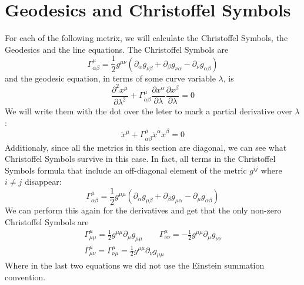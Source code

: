\documentclass{article}
\begin{document}
\section{Geodesics and Christoffel Symbols}
For each of the following metrix, we will calculate the Christoffel Symbols, the Geodesics and the line equations. The Christoffel Symbols are
\begin{equation}
    \Gamma^\mu_{\alpha\beta} = \frac{1}{2}g^{\mu\nu}\left(\partial_{\alpha}g_{\nu\beta} + \partial_{\beta}g_{\nu\alpha} - \partial_{\nu}g_{\alpha\beta}\right)
\end{equation}
and the geodesic equation, in terms of some curve variable $\lambda$, is
\begin{equation}
    \frac{\partial^2 x^\mu}{\partial \lambda^2} + \Gamma^\mu_{\alpha\beta} \frac{\partial x^\alpha}{\partial \lambda} \frac{\partial x^\beta}{\partial \lambda} = 0
\end{equation}
We will write them with the dot over the leter to mark a partial derivative over $\lambda$:
\begin{equation}
\label{eq:geodesic}
    \ddot{x}^\mu + \Gamma^\mu_{\alpha\beta}\dot{x}^\alpha\dot{x}^\beta = 0
\end{equation}
Additionaly, since all the metrics in this section are diagonal, we can see what Christoffel Symbols survive in this case. In fact, all terms in the Christoffel Symbols formula that include an off-diagonal element of the metric $g^{ij}$ where $i \ne j$ disappear:
\begin{equation}
    \Gamma^\mu_{\alpha\beta} = \frac{1}{2}g^{\mu\mu}\left(\partial_{\alpha}g_{\mu\beta} + \partial_{\beta}g_{\mu\alpha} - \partial_{\mu}g_{\alpha\beta}\right)
\end{equation}
We can perform this again for the derivatives and get that the only non-zero Christoffel Symbols are
\begin{equation}
\label{eq:christoffel}
\begin{gathered}
    \Gamma^\mu_{\mu\mu} = \frac{1}{2}g^{\mu\mu}\partial_{\mu}g_{\mu\mu}
    \qquad
    \Gamma^\mu_{\nu\nu} = -\frac{1}{2}g^{\mu\mu}\partial_{\mu}g_{\nu\nu}
    \\
    \Gamma^\mu_{\mu\nu} = \Gamma^\mu_{\nu\mu} = \frac{1}{2}g^{\mu\mu}\partial_{\nu}g_{\mu\mu}
\end{gathered}
\end{equation}
Where in the last two equations we did not use the Einstein summation convention. 
\end{document}

